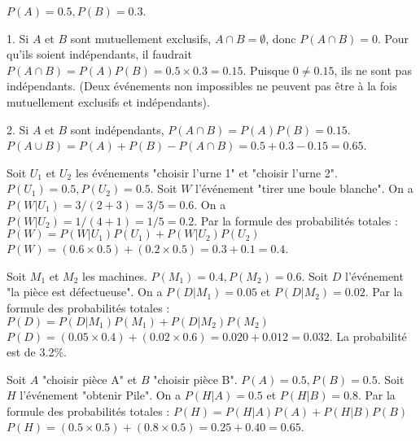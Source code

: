 \begin{correctionbox}
$P(A)=0.5, P(B)=0.3$.

1.  Si $A$ et $B$ sont mutuellement exclusifs, $A \cap B = \emptyset$, donc $P(A \cap B) = 0$.
    Pour qu'ils soient indépendants, il faudrait $P(A \cap B) = P(A)P(B) = 0.5 \times 0.3 = 0.15$.
    Puisque $0 \neq 0.15$, ils ne sont pas indépendants. (Deux événements non impossibles ne peuvent pas être à la fois mutuellement exclusifs et indépendants).

2.  Si $A$ et $B$ sont indépendants, $P(A \cap B) = P(A)P(B) = 0.15$.
    $P(A \cup B) = P(A) + P(B) - P(A \cap B) = 0.5 + 0.3 - 0.15 = 0.65$.
\end{correctionbox}


\begin{correctionbox}
Soit $U_1$ et $U_2$ les événements "choisir l'urne 1" et "choisir l'urne 2". $P(U_1)=0.5, P(U_2)=0.5$.
Soit $W$ l'événement "tirer une boule blanche".
On a $P(W|U_1) = 3 / (2+3) = 3/5 = 0.6$.
On a $P(W|U_2) = 1 / (4+1) = 1/5 = 0.2$.
Par la formule des probabilités totales :
$P(W) = P(W|U_1)P(U_1) + P(W|U_2)P(U_2)$
$P(W) = (0.6 \times 0.5) + (0.2 \times 0.5) = 0.3 + 0.1 = 0.4$.
\end{correctionbox}

\begin{correctionbox}
Soit $M_1$ et $M_2$ les machines. $P(M_1)=0.4, P(M_2)=0.6$.
Soit $D$ l'événement "la pièce est défectueuse".
On a $P(D|M_1) = 0.05$ et $P(D|M_2) = 0.02$.
Par la formule des probabilités totales :
$P(D) = P(D|M_1)P(M_1) + P(D|M_2)P(M_2)$
$P(D) = (0.05 \times 0.4) + (0.02 \times 0.6) = 0.020 + 0.012 = 0.032$.
La probabilité est de 3.2\%.
\end{correctionbox}

\begin{correctionbox}
Soit $A$ "choisir pièce A" et $B$ "choisir pièce B". $P(A)=0.5, P(B)=0.5$.
Soit $H$ l'événement "obtenir Pile".
On a $P(H|A) = 0.5$ et $P(H|B) = 0.8$.
Par la formule des probabilités totales :
$P(H) = P(H|A)P(A) + P(H|B)P(B)$
$P(H) = (0.5 \times 0.5) + (0.8 \times 0.5) = 0.25 + 0.40 = 0.65$.
\end{correctionbox}


